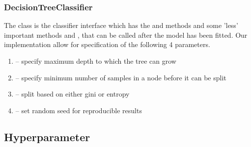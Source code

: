 \subsubsection{DecisionTreeClassifier}
The  class is the classifier interface
which has the  and  methods and some 'less' important
methods  and , that can be called after the model has been fitted.
Our implementation allow for specification of the following 4 parameters.\\
\begin{enumerate}
    \item {} -- specify maximum depth to which the tree can grow
    \item {} -- specify minimum number of samples in a node before it can be split
    \item {} -- split based on either gini or entropy
    \item {} -- set random seed for reproducible results
    \end{enumerate}
\vspace{10pt}


\subsection{Hyperparameter}